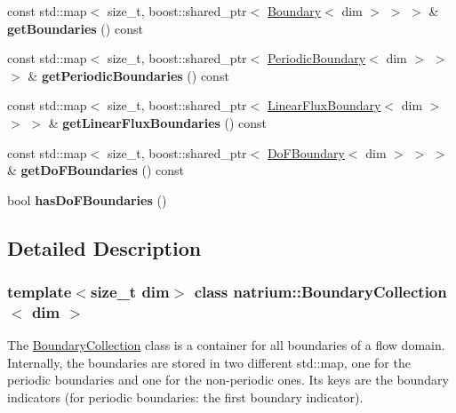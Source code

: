 \begin{DoxyCompactItemize}
\item 
\hypertarget{classnatrium_1_1BoundaryCollection_a3c7a2ed26b19c2650c91e89052f94025}{
const std::map$<$ size\_\-t, boost::shared\_\-ptr$<$ \hyperlink{classnatrium_1_1Boundary}{Boundary}$<$ dim $>$ $>$ $>$ \& {\bfseries getBoundaries} () const }
\label{classnatrium_1_1BoundaryCollection_a3c7a2ed26b19c2650c91e89052f94025}

\item 
\hypertarget{classnatrium_1_1BoundaryCollection_a280f2769a647610ee330205e8038239c}{
const std::map$<$ size\_\-t, boost::shared\_\-ptr$<$ \hyperlink{classnatrium_1_1PeriodicBoundary}{PeriodicBoundary}$<$ dim $>$ $>$ $>$ \& {\bfseries getPeriodicBoundaries} () const }
\label{classnatrium_1_1BoundaryCollection_a280f2769a647610ee330205e8038239c}

\item 
\hypertarget{classnatrium_1_1BoundaryCollection_a3b04ece6b8b942c2189493eea93fe9b4}{
const std::map$<$ size\_\-t, boost::shared\_\-ptr$<$ \hyperlink{classnatrium_1_1LinearFluxBoundary}{LinearFluxBoundary}$<$ dim $>$ $>$ $>$ \& {\bfseries getLinearFluxBoundaries} () const }
\label{classnatrium_1_1BoundaryCollection_a3b04ece6b8b942c2189493eea93fe9b4}

\item 
\hypertarget{classnatrium_1_1BoundaryCollection_a78baba7c1d84139fe939a805e5a6f941}{
const std::map$<$ size\_\-t, boost::shared\_\-ptr$<$ \hyperlink{classnatrium_1_1DoFBoundary}{DoFBoundary}$<$ dim $>$ $>$ $>$ \& {\bfseries getDoFBoundaries} () const }
\label{classnatrium_1_1BoundaryCollection_a78baba7c1d84139fe939a805e5a6f941}

\item 
\hypertarget{classnatrium_1_1BoundaryCollection_a5cf479c4e1ce37cea40b81ebbe5500b8}{
bool {\bfseries hasDoFBoundaries} ()}
\label{classnatrium_1_1BoundaryCollection_a5cf479c4e1ce37cea40b81ebbe5500b8}

\end{DoxyCompactItemize}


\subsection{Detailed Description}
\subsubsection*{template$<$size\_\-t dim$>$ class natrium::BoundaryCollection$<$ dim $>$}

The \hyperlink{classnatrium_1_1BoundaryCollection}{BoundaryCollection} class is a container for all boundaries of a flow domain. Internally, the boundaries are stored in two different std::map, one for the periodic boundaries and one for the non-\/periodic ones. Its keys are the boundary indicators (for periodic boundaries: the first boundary indicator). 

